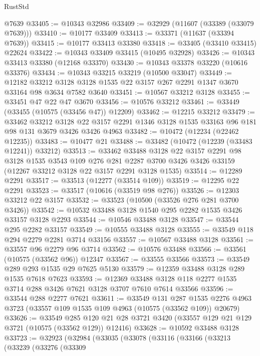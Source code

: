 \begin{lexlean}{RustStd}
\begin{coremodule}
    @7639
@33405 := @10343 @32986
@33409 := @32929 (@11607 (@33389 (@33079 @7639)))
@33410 := @10177 @33409
@33413 := @33371 (@11637 (@33394 @7639))
@33415 := @10177 @33413 @33380
@33418 := @33405 (@33410 @33415) @22624
@33422 := @10343 @33409 @33415 (@10495 @32928)
@33426 := @10343 @33413 @33380 (@12168 @33370)
@33430 := @10343 @33378 @33220 (@10616 @33376)
@33434 := @10343 @33215 @33219 (@10500 @33047)
@33449 := @12182
    @33212
    @3128
    @3128
    @1535
    @22
    @3157
    @267
    @2291
    @1347
    @3670
    @33164
    @98
    @3634
    @7582
    @3640
@33451 := @10567 @33212 @3128
@33455 := @33451 @47 @22 @47 @3670
@33456 := @10576 @33212
@33461 := @33449 (@33455 (@10575 (@33456 @47)) @12209)
@33462 := @12215 @33212
@33479 := @33462
    @33212
    @3128
    @22
    @3157
    @2291
    @1346
    @3128
    @1535
    @33163
    @96
    @181
    @98
    @131
    @3679
    @3426
    @3426
    @4963
@33482 := @10472 (@12234 (@22462 @12235))
@33483 := @10477 @21
@33488 := @33482 (@10472 (@12239 (@33483 @12241)) @33212)
@33513 := @33462
    @33488
    @3128
    @22
    @3157
    @2291
    @98
    @3128
    @1535
    @3543
    @109
    @276
    @281
    @2287
    @3700
    @3426
    @3426
    @33159
    (@12267 @33212 @3128 @22 @3157 @2291 @3128 @1535)
@33514 := @12289 @2291
@33517 := @33513 (@12277 (@33514 @109))
@33519 := @12295 @22 @2291
@33523 := @33517 (@10616 (@33519 @98 @276))
@33526 := @12303 @33212 @22 @3157
@33532 := @33523 (@10500 (@33526 @276 @281 @3700 @3426))
@33542 := @10532 @33488 @3128 @1540 @295 @2282 @1535 @3426 @33157 @3128 @2293
@33544 := @10546 @33488 @3128
@33547 := @33544 @295 @2282 @33157
@33549 := @10555 @33488 @3128
@33555 := @33549 @118 @294 @2279 @2281 @3714 @33156
@33557 := @10567 @33488 @3128
@33561 := @33557 @96 @2279 @96 @3714
@33562 := @10576 @33488
@33566 := @33561 (@10575 (@33562 @96)) @12347
@33567 := @33555 @33566
@33573 := @33549 @289 @293 @1535 @29 @7625 @5130
@33579 := @12359 @33488 @3128 @289 @1535 @7618 @7623
@33593 := @12369 @33488 @3128 @118 @2277 @1535 @3714 @288 @3426 @7621 @3128 @3707 @7610 @7614 @33566
@33596 := @33544 @288 @2277 @7621
@33611 := @33549
    @131
    @287
    @1535
    @2276
    @4963
    @3723
    (@33557 @109 @1535 @109 @4963 (@10575 (@33562 @109)) @20679)
@33626 := @33549
    @285
    @120
    @21
    @28
    @3721
    @3420
    (@33557 @129 @21 @129 @3721 (@10575 (@33562 @129)) @12416)
@33628 := @10592 @33488 @3128
@33723 := @32923
    (@32984
      (@33035
        (@33078
          (@33116
            (@33166
              (@33213
                (@33239
                  (@33276
                    (@33309

\end{coremodule}
\end{lexlean}

